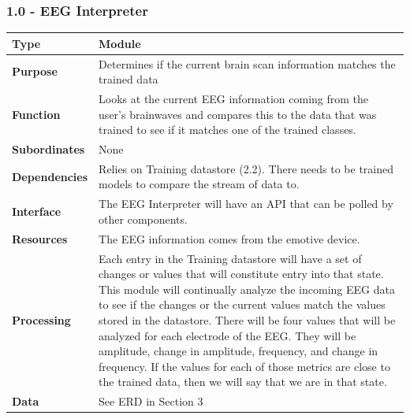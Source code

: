 \documentclass{article}
\begin{document}
\subsubsection*{1.0 - EEG Interpreter}
\begin{tabular}{ | l |  p{13.3cm} |}
\hline
\textbf{Type} & Module \\ \hline
\textbf{Purpose} & Determines if the current brain scan information matches the trained data \\ \hline
\textbf{Function} & Looks at the current EEG information coming from the user's brainwaves and compares this to the data that was trained to see if it matches one of the trained classes. \\ \hline
\textbf{Subordinates} & None \\ \hline
\textbf{Dependencies} & Relies on Training datastore (2.2). There needs to be trained models to compare the stream of data to. \\ \hline
\textbf{Interface} & The EEG Interpreter will have an API that can be polled by other components. \\ \hline
\textbf{Resources} & The EEG information comes from the emotive device. \\ \hline
\textbf{Processing} & Each entry in the Training datastore will have a set of changes or values that will constitute entry into that state. This module will continually analyze the incoming EEG data to see if the changes or the current values match the values stored in the datastore. There will be four values that will be analyzed for each electrode of the EEG. They will be amplitude, change in amplitude, frequency, and change in frequency. If the values for each of those metrics are close to the trained data, then we will say that we are in that state.\\ \hline
\textbf{Data} & See ERD in Section 3 \\ \hline
\end{tabular}
\end{document}

